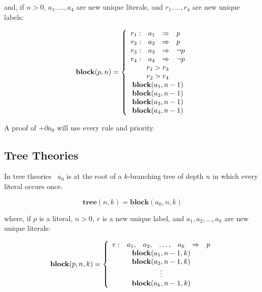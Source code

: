 {\noindent and, if $n > 0$, 
$a_{1}, \ldots ,a_{4}$ are new unique literals,
and $r_{1}, \ldots ,r_{4}$ are new unique labels:

\[\mathbf{block}(p,n) =  
   \left\{ \begin{array}{rlll} 
      r_{1}: & a_{1} & \Rightarrow & p                \\
      r_{2}: & a_{2} & \Rightarrow & p                \\
      r_{3}: & a_{3} & \Rightarrow & \neg p            \\
      r_{4}: & a_{4} & \Rightarrow & \neg p            \\
      \multicolumn{4}{c}{r_{1} > r_{3}}             \\
      \multicolumn{4}{c}{r_{2} > r_{4}}             \\
      \multicolumn{4}{c}{\mathbf{block}(a_{1},n-1)} \\
      \multicolumn{4}{c}{\mathbf{block}(a_{2},n-1)} \\
      \multicolumn{4}{c}{\mathbf{block}(a_{3},n-1)} \\
      \multicolumn{4}{c}{\mathbf{block}(a_{4},n-1)} 
   \end{array} \right.\]

A proof of $+\partial a_{0}$ will use every rule and 
priority.



\subsection{Tree Theories} %

\label{treeTheories}

In tree theories \treeTh\, $a_{0}$ is at
the root of a $k$-branching tree of depth $n$ in which
every literal occurs once.

\[\mathbf{tree}(n,k) = \mathbf{block}(a_{0},n, k)\]

\noindent where, if $p$ is a literal, $n > 0$, $r$
is a new unique label, and $a_{1}, a_{2}, \ldots ,
a_{k}$ are new unique literals:

\[\mathbf{block}(p,n,k) =  \left\{ \begin{array}{rllllll} 
   r: &  a_{1}, & a_{2}, & \ldots , & a_{k} & \Rightarrow & p \\
   \multicolumn{7}{c}{\mathbf{block}(a_{1},n-1,k)}  \\
   \multicolumn{7}{c}{\mathbf{block}(a_{2},n-1,k)}  \\
   \multicolumn{7}{c}{\vdots}                        \\
   \multicolumn{7}{c}{\mathbf{block}(a_{k},n-1,k)}  
\end{array} \right.\]

}
